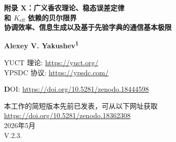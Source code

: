\documentclass[12pt,a4paper]{article}
\theoremstyle{remark}
\begin{document}
	
	\begin{titlepage}
		\begin{center}
			\vspace*{1cm}
			
			\Huge\textbf{附录 X：广义香农理论、稳态误差定律\\和 \(K_{\mathrm{eff}}\) 依赖的贝尔限界} \\
			\vspace{0.5cm}
			\Large\textbf{协调效率、信息生成以及基于先验字典的通信基本极限}
			
			\vspace{1.5cm}
			
			\Large\textbf{Alexey V. Yakushev\textsuperscript{1}}
			
			YUCT 理论: \url{https://yuct.org/}\\
			YPSDC 协议: \url{https://ypsdc.com/}\\
			
			\vspace{2cm}
			
			\textbf DOI: \url{https://doi.org/10.5281/zenodo.18444598}\\
			
			\vspace{1cm}
			
			\large 
			本工作的简短版本先前已发表，可从以下网址获取\\ \url{https://doi.org/10.5281/zenodo.18362308}\\
			\vspace{1cm}
			2026年5月 \\ \large V.2.3.
			
			\vspace{2cm}
			
			\begin{minipage}{0.9\textwidth}
				\begin{abstract}
					\noindent
					本附录将 YPSDC 协议的广义信息论与雅库舍夫统一协调理论 (YUCT) 的其余部分完全一致化。通用误差定律采用\textbf{稳态幂律形式}
					\[
					\varepsilon = \kappa_c \, \alpha \, K_{\mathrm{eff}}^{-\beta},
					\qquad \beta = \frac{2}{3},\quad \kappa_c = \frac{1}{3},
					\]
					与附录 Y 的微观推导、附录 L 的经验验证以及主要代数环 \(S_{\mathrm{odd}}+S_{\mathrm{even}}=2\) 的闭合一致。由这一定律我们推导出广义贝尔不等式
					\[
					S(K_{\mathrm{eff}}) = 2 + \bigl(2\sqrt{2}-2\bigr)\,
					\bigl(1 - 2\kappa_c\alpha K_{\mathrm{eff}}^{-\beta}\bigr),
					\]
					该式在 \(K_{\mathrm{eff}}=1\) 时重现经典局域实在论界限 \(S=2\)，在 \(K_{\mathrm{eff}}\to\infty\) 时重现蔡尔森界限 \(S=2\sqrt{2}\)。先前的对数变体 \(\varepsilon\propto(\ln K_{\mathrm{eff}})^{2/3}\) 被明确抛弃，因为其缺乏物理动机且与 YUCT 的核心结构不一致。所有依赖于 \(\varepsilon(K_{\mathrm{eff}})\) 函数形式的章节——有用协调容量、最优字典大小、热力学效率、柯尔莫戈洛夫复杂度界限以及向意义生成的相变——均已相应更新。因此，本版附录 X 提供了协调效率、信道容量、量子关联和字典热力学的统一、无参数描述。
				\end{abstract}
			\end{minipage}
			

\end{center}
\end{titlepage}
\end{document}

